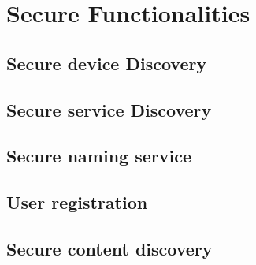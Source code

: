 \section{Secure Functionalities}
\label{sec:technique-in-depth}

\subsection{Secure device Discovery}
\subsection{Secure service Discovery}
\subsection{Secure naming service}
\subsection{User registration}
\subsection{Secure content discovery}
